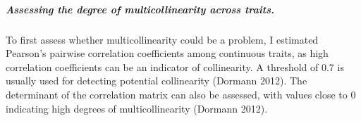 \subparagraph{Assessing the degree of multicollinearity across traits.}
To first assess whether multicollinearity could be a problem, I estimated Pearson's pairwise correlation coefficients among continuous traits, as high correlation coefficients can be an indicator of collinearity. A threshold of 0.7 is usually used for detecting potential collinearity (Dormann 2012). The determinant of the correlation matrix can also be assessed, with values close to 0 indicating high degrees of multicollinearity (Dormann 2012).

